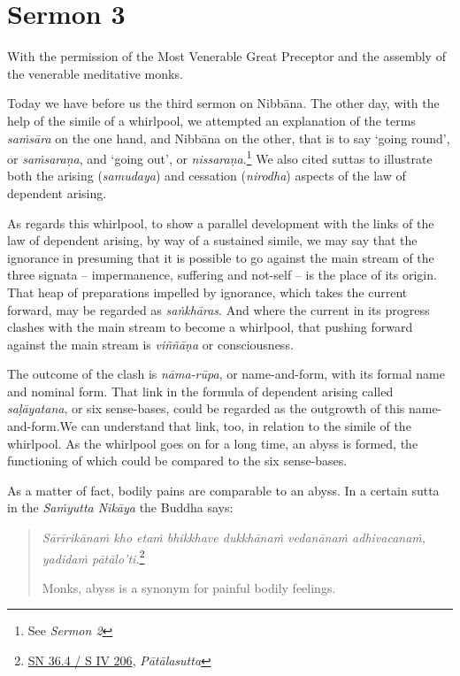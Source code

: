 \chapter{Sermon 3}

\NibbanaOpeningQuote

With the permission of the Most Venerable Great Preceptor and the assembly of the venerable meditative monks.

Today we have before us the third sermon on Nibbāna. The other day, with the help of the simile of a whirlpool, we attempted an explanation of the terms \emph{saṁsāra} on the one hand, and Nibbāna on the other, that is to say `going round', or \emph{saṁsaraṇa}, and `going out', or \emph{nissaraṇa}.\footnote{See \emph{Sermon 2}} We also cited suttas to illustrate both the arising (\emph{samudaya}) and cessation (\emph{nirodha}) aspects of the law of dependent arising.

As regards this whirlpool, to show a parallel development with the links of the law of dependent arising, by way of a sustained simile, we may say that the ignorance in presuming that it is possible to go against the main stream of the three signata -- impermanence, suffering and not-self -- is the place of its origin. That heap of preparations impelled by ignorance, which takes the current forward, may be regarded as \emph{saṅkhāras}. And where the current in its progress clashes with the main stream to become a whirlpool, that pushing forward against the main stream is \emph{viññāṇa} or consciousness.

The outcome of the clash is \emph{nāma-rūpa}, or name-and-form, with its formal name and nominal form. That link in the formula of dependent arising called \emph{saḷāyatana}, or six sense-bases, could be regarded as the outgrowth of this name-and-form.We can understand that link, too, in relation to the simile of the whirlpool. As the whirlpool goes on for a long time, an abyss is formed, the functioning of which could be compared to the six sense-bases.

As a matter of fact, bodily pains are comparable to an abyss. In a certain sutta in the \emph{Saṁyutta Nikāya} the Buddha says:

\begin{quote}
\emph{Sārīrikānaṁ kho etaṁ bhikkhave dukkhānaṁ vedanānaṁ adhivacanaṁ, yadidaṁ pātālo'ti.}\footnote{\href{https://suttacentral.net/sn36.4/pli/ms}{SN 36.4 / S IV 206}, \emph{Pātālasutta}}

Monks, abyss is a synonym for painful bodily feelings.
\end{quote}

